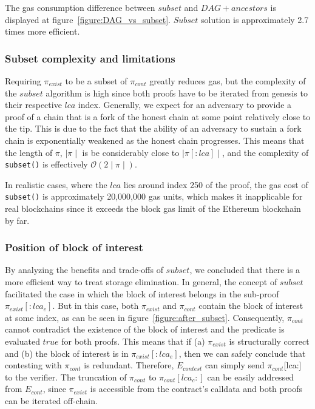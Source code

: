 

The gas consumption difference between $subset$ and $DAG + ancestors$ is
displayed at figure~\ref{figure:DAG_vs_subset}. $Subset$ solution is
approximately 2.7 times more efficient.



\subsubsection{Subset complexity and limitations} Requiring $\pi_{exist}$ to be a subset of
$\pi_{cont}$ greatly reduces gas, but the complexity of the $subset$ algorithm
is high since both proofs have to be iterated from genesis to their respective
$lca$ index. Generally, we expect for an adversary to provide a proof of a
chain that is a fork of the honest chain at some point relatively close to the
tip. This is due to the fact that the ability of an adversary to sustain a fork
chain is exponentially weakened as the honest chain progresses.  This means
that the length of $\pi$, $\mid\pi\mid$ is be considerably close to
$\mid\pi[:lca]\mid$, and the complexity of \texttt{subset()} is effectively
$\mathcal{O}(2\mid\pi\mid)$.

In realistic cases, where the $lca$ lies around index 250 of the proof, the gas
cost of \texttt{subset()} is approximately 20,000,000 gas units, which makes it
inapplicable for real blockchains since it exceeds the block gas limit of
the Ethereum blockchain by far.

\subsubsection{Position of block of interest}

By analyzing the benefits and trade-offs of $subset$, we concluded that there
is a more efficient way to treat storage elimination. In general, the concept
of $subset$ facilitated the case in which the block of interest belongs in the
sub-proof $\pi_{exist}[:lca_{e}]$. But in this case, both $\pi_{exist}$ and
$\pi_{cont}$ contain the block of interest at some index, as can be seen in
figure~\ref{figure:after_subset}. Consequently, $\pi_{cont}$ cannot contradict
the existence of the block of interest and the predicate is evaluated $true$
for both proofs. This means that if (a) $\pi_{exist}$ is structurally correct
and (b) the block of interest is in $\pi_{exist}[:lca_{e}]$, then we can safely
conclude that contesting with $\pi_{cont}$ is redundant. Therefore,
$E_{contest}$ can simply send $\pi_{cont}$[lca:] to the verifier. The
truncation of $\pi_{cont}$ to $\pi_{cont}[lca_{c}:]$ can be easily addressed
from $E_{cont}$, since $\pi_{exist}$ is accessible from the contract's
calldata and both proofs can be iterated off-chain.

